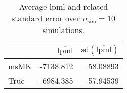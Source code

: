 \begin{table}[H]

\caption{Average lpml and related standard error over $n_{\text{sim}} = 10$ simulations.}
\centering
\begin{tabular}[t]{lrr}
\toprule
  & $\overbar{\text{lpml}}$ & $\text{sd}(\overbar{\text{lpml}})$\\
\midrule
msMK & -7138.812 & 58.08893\\
True & -6984.385 & 57.94539\\
\bottomrule
\end{tabular}
\end{table}